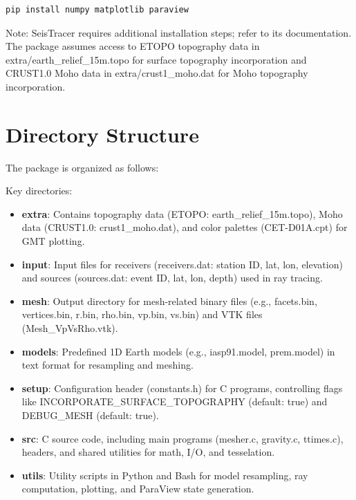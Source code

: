 \documentclass[12pt,a4paper]{article}
\begin{document}
\begin{lstlisting}[language=Bash]
pip install numpy matplotlib paraview
\end{lstlisting}

Note: SeisTracer requires additional installation steps; refer to its documentation. The package assumes access to ETOPO topography data in extra/earth\_relief\_15m.topo for surface topography incorporation and CRUST1.0 Moho data in extra/crust1\_moho.dat for Moho topography incorporation.

\section{Directory Structure}
The package is organized as follows:


Key directories:

\begin{itemize}
    \item \textbf{extra}: Contains topography data (ETOPO: earth\_relief\_15m.topo), Moho data (CRUST1.0: crust1\_moho.dat), and color palettes (CET-D01A.cpt) for GMT plotting.
    \item \textbf{input}: Input files for receivers (receivers.dat: station ID, lat, lon, elevation) and sources (sources.dat: event ID, lat, lon, depth) used in ray tracing.
    \item \textbf{mesh}: Output directory for mesh-related binary files (e.g., facets.bin, vertices.bin, r.bin, rho.bin, vp.bin, vs.bin) and VTK files (Mesh\_VpVsRho.vtk).
    \item \textbf{models}: Predefined 1D Earth models (e.g., iasp91.model, prem.model) in text format for resampling and meshing.
    \item \textbf{setup}: Configuration header (constants.h) for C programs, controlling flags like INCORPORATE\_SURFACE\_TOPOGRAPHY (default: true) and DEBUG\_MESH (default: true).
    \item \textbf{src}: C source code, including main programs (mesher.c, gravity.c, ttimes.c), headers, and shared utilities for math, I/O, and tesselation.
    \item \textbf{utils}: Utility scripts in Python and Bash for model resampling, ray computation, plotting, and ParaView state generation.
\end{itemize}
\end{document}
